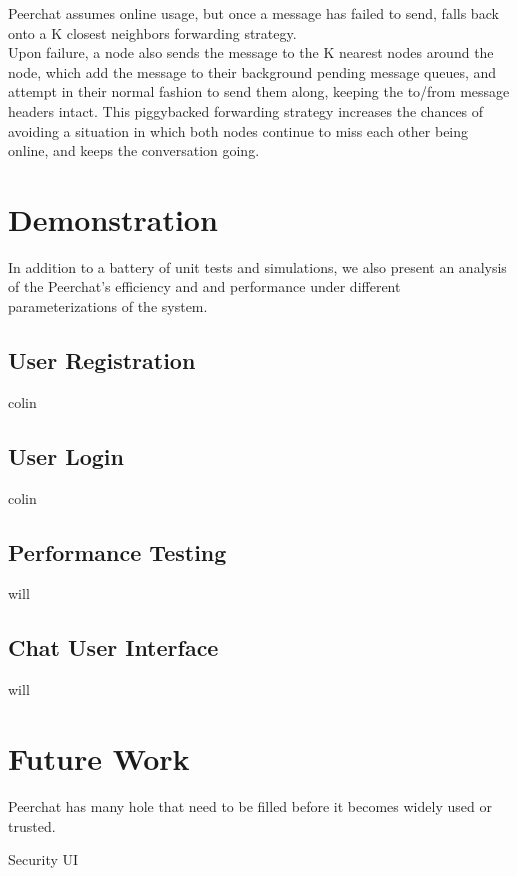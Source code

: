 \documentclass{article}
\begin{document}
Peerchat assumes online usage, but once a message has failed to send, falls back onto a K closest neighbors forwarding strategy. \\

Upon failure, a node also sends the message to the K nearest nodes around the node, which add the message to their background pending message queues, and attempt in their normal fashion to send them along, keeping the to/from message headers intact. This piggybacked forwarding strategy increases the chances of avoiding a situation in which both nodes continue to miss each other being online, and keeps the conversation going. 

\section{Demonstration}

In addition to a battery of unit tests and simulations, we also present an analysis of the Peerchat's efficiency and and performance under different parameterizations of the system. 

\subsection{User Registration}

colin

\subsection{User Login}

colin 

\subsection{Performance Testing}

will

\subsection{Chat User Interface}

will

\section{Future Work}

Peerchat has many hole that need to be filled before it becomes widely used or trusted. 

Security
UI
\end{document}
